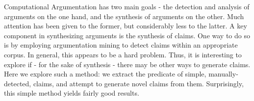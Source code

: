 Computational Argumentation has two main goals - the detection and analysis of arguments on the one hand, and the synthesis of arguments on the other. Much attention has been given to the former, but considerably less to the latter. A key component in synthesizing arguments is the synthesis of claims. One way to do so is by employing argumentation mining to detect claims within an appropriate corpus. In general, this appears to be a hard problem. Thus, it is interesting to explore if - for the sake of synthesis - there may be other ways to generate claims. Here we explore such a method: we extract the predicate of simple, manually-detected, claims, and attempt to generate novel claims from them. Surprisingly, this simple method yields fairly good results.
